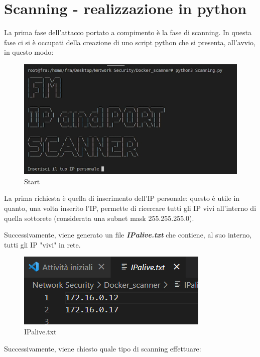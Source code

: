 \setcounter{secnumdepth}{5}

\chapter{Scanning - realizzazione in python}
La prima fase dell'attacco portato a compimento è la fase di scanning. In questa fase ci si è occupati della creazione di uno script python che si presenta, all'avvio, in questo modo:

\begin{figure}[H]
    \includegraphics[scale=0.5]{UNINA_MSc_Thesis_Project/img/Esecuzione/Scanning_start.png}
    \centering
    \caption{Start}
    \label{fig:my_label}
\end{figure}

La prima richiesta è quella di inserimento dell'IP personale: questo è utile in quanto, una volta inserito l'IP, permette di ricercare tutti gli IP vivi all'interno di quella sottorete (considerata una subnet mask 255.255.255.0). 

Successivamente, viene generato un file \textbf{\textit{IPalive.txt}} che contiene, al suo interno, tutti gli IP "vivi" in rete. 

\begin{figure}[H]
    \centering
    \includegraphics{UNINA_MSc_Thesis_Project/img/Esecuzione/ipalive.png}
    \caption{IPalive.txt}
    \label{fig:my_label}
\end{figure}

Successivamente, viene chiesto quale tipo di scanning effettuare:

